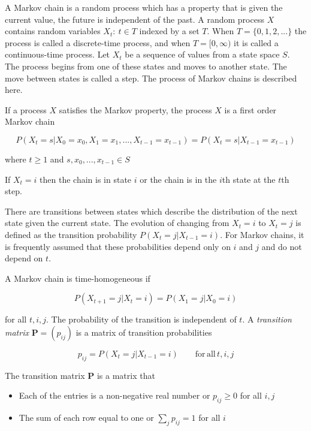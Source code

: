 A Markov chain is a random process which has a property that is given
the current value, the future is independent of the past. A random
process $X$ contains random variables $X_{t}:\:t\in T$ indexed by
a set $T$. When $T=\{0,1,2,...\}$ the process is called a discrete-time
process, and when $T=[0,\infty)$ it is called a continuous-time process.
Let $X_{t}$ be a sequence of values from a state space $S$. The
process begins from one of these states and moves to another state.
The move between states is called a step. The process of Markov chains
is described here.
\begin{defn}
\citep[p.214]{grimmett2001probability} If a process $X$ satisfies
the Markov property, the process $X$ is a first order Markov chain

\[
P(X_{t}=s|X_{0}=x_{0},X_{1}=x_{1},...,X_{t-1}=x_{t-1})=P(X_{t}=s|X_{t-1}=x_{t-1})
\]

where $t\ge1$ and $s,x_{0},...,x_{t-1}\in S$
\end{defn}
If $X_{t}=i$ then the chain is in state $i$ or the chain is in the
$i$th state at the $t$th step. 

There are transitions between states which describe the distribution
of the next state given the current state. The evolution of changing
from $X_{t}=i$ to $X_{t}=j$ is defined as the transition probability
$P(X_{t}=j|X_{t-1}=i)$. For Markov chains, it is frequently assumed
that these probabilities depend only on $i$ and $j$ and do not depend
on $t$.
\begin{defn}
\citep[p.214]{grimmett2001probability} A Markov chain is time-homogeneous
if

\[
P(X_{t+1}=j|X_{t}=i)=P(X_{1}=j|X_{0}=i)
\]

for all $t,i,j$. The probability of the transition is independent
of $t$. A \emph{transition matrix} $\mathbf{P}=(p_{ij})$ is a matrix
of transition probabilities 

\[
p_{ij}=P(X_{t}=j|X_{t-1}=i)\qquad\mathrm{for}\,\mathrm{all\,}t,i,j
\]
\end{defn}
\begin{thm*}
\citep[p.215]{grimmett2001probability} The transition matrix $\mathbf{P}$
is a matrix that
\begin{itemize}
\item Each of the entries is a non-negative real number or $p_{ij}\ge0$
for all $i,j$
\item The sum of each row equal to one or $\sum_{j}p_{ij}=1$ for all $i$
\end{itemize}
\end{thm*}

